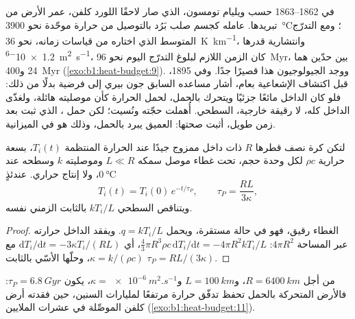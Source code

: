 \begin{history}
في 1862–1863 حسب ويليام تومسون، الذي صار لاحقًا اللورد كلفن، عمر الأرض من تبريدها. عامله كجسم صلب بَرُد بالتوصيل من حرارة موحّدة نحو \qty{3900}{\degreeCelsius}؛ ومع التدرّج المتوسط الذي اختاره من قياسات زمانه، نحو \qty{36}{K.km^{-1}}، وانتشارية قدرها \qty{1.2e-6}{m^2.s^{-1}}، كان الزمن اللازم لبلوغ التدرّج اليوم نحو \qty{96}{Myr}، بين حدّين هما 24 و\qty{400}{Myr} (\cref{exo:b1:heat-budget:9}). ووجد الجيولوجيون هذا قصيرًا جدًا. وفي 1895، قبل اكتشاف الإشعاعية بعام، أشار مساعده السابق جون بيري إلى فرضية بدلًا من ذلك: فلو كان الداخل مائعًا جزئيًا ويتحرك بالحمل، لحمل الحرارة كأن موصليته هائلة، ولغذّى الداخل كله، لا  رقيقة خارجية،  السطحي. أُهملت حجّته ونُسيت؛ لكن حمل ، الذي ثبت بعد زمن طويل، أثبت صحتها:  العميق يبرد بالحمل، وذلك هو  في الميزانية. %
\end{history}

\begin{proposition}\label{prop:b1:heat-budget:perry}
لتكن كرة نصف قطرها $R$ ذات داخل ممزوج جيدًا عند الحرارة المنتظمة $T_i(t)$، بسعة حرارية $\rho c$ لكل وحدة حجم، تحت غطاء موصل سمكه $L \ll R$ وموصليته $k$ وسطحه عند $\qty{0}{\degreeCelsius}$، ولا إنتاج حراري. عندئذٍ
\[
  T_i(t) = T_i(0)\,e^{-t/\tau_P}, \qquad \tau_P = \frac{RL}{3\kappa},
\]
ويتناقص  السطحي $kT_i/L$ بالثابت الزمني نفسه.
\end{proposition}

\begin{proof}
الغطاء رقيق، فهو في حالة مستقرة، ويحمل  $q = kT_i/L$. ويفقد الداخل حرارته عبر المساحة $4\pi R^2$:
$\tfrac43\pi R^3\rho c\,\mathrm dT_i/\mathrm dt = -4\pi R^2 kT_i/L$، أي
$\mathrm dT_i/\mathrm dt = -3\kappa T_i/(RL)$ مع $\kappa = k/(\rho c)$، وحلّها الأسّي بالثابت $\tau_P = RL/(3\kappa)$.
\end{proof}

من أجل $R = \qty{6400}{km}$، و$L = \qty{100}{km}$ و$\kappa =
\qty{e-6}{m^2.s^{-1}}$، يكون $\tau_P = \qty{6.8}{Gyr}$: فالأرض المتحركة بالحمل تحفظ تدفّق حرارة مرتفعًا لمليارات السنين، حين فقدته أرض كلفن الموصِّلة في عشرات الملايين (\cref{exo:b1:heat-budget:11}).

